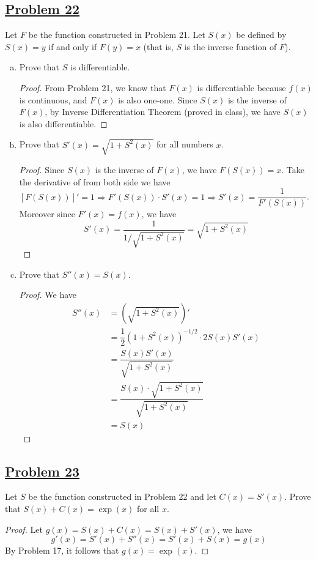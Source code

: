 \documentclass[10pt,letterpaper]{article}
\begin{document}
	\subsection*{{\color{purple}\underline{Problem 22}}}
	Let $F$ be the function constructed in Problem 21. Let $S(x)$ be defined by $S(x) = y$ if
	and only if $F(y) = x$ (that is, $S$ is the inverse function of $F$).
	\begin{enumerate}[(a)]
\item Prove that $S$ is differentiable.
\begin{proof}
	From Problem 21, we know that $F(x)$ is differentiable because $f(x)$ is continuous, and $F(x)$
	is also one-one. Since $S(x)$ is the inverse of $F(x)$, by Inverse Differentiation Theorem (proved in class),
	we have $S(x)$ is also differentiable.
\end{proof}
\item Prove that $S'(x) = \sqrt{1 + S^2(x)}$ for all numbers $x$.
\begin{proof}
	Since $S(x)$ is the inverse of $F(x)$, we have $F(S(x)) = x$. Take the derivative of 
	from both side we have $[F(S(x))]' = 1 \Rightarrow
	F'(S(x)) \cdot S'(x) = 1 \Rightarrow S'(x) = \dfrac{1}{F'(S(x))}$. Moreover
	since $F'(x) = f(x)$, we have
	$$S'(x) = \dfrac{1}{1/\sqrt{1 + S^{2}(x)}} = \sqrt{1 + S^{2}(x)}$$

\end{proof}

\item Prove that $S''(x) = S(x)$.
\begin{proof}
	We have
\begin{align*}
	S''(x) &= (\sqrt{1 + S^2(x)})' \\
	&= \dfrac{1}{2}(1 + S^2(x))^{-1/2} \cdot 2S(x)S'(x) \\
	&= \dfrac{S(x)S'(x)}{\sqrt{1 + S^2(x)}} \\
	&= \dfrac{S(x) \cdot \sqrt{1 + S^2(x)}}{\sqrt{1 + S^2(x)}} \\
	&= S(x)
\end{align*}
\end{proof}
	\end{enumerate}
	
	\subsection*{{\color{purple}\underline{Problem 23}}}
	Let $S$ be the function constructed in Problem 22 and let $C(x) = S'(x)$. Prove that
	$S(x) + C(x) = \exp(x)$ for all $x$.
\begin{proof}
	Let $g(x) = S(x) + C(x) = S(x) + S'(x)$, we have 
	$$g'(x) = S'(x) + S''(x) = S'(x) + S(x) = g(x)$$
	By Problem 17, it follows that $g(x) = \exp(x)$.
\end{proof}	
	
\end{document}
